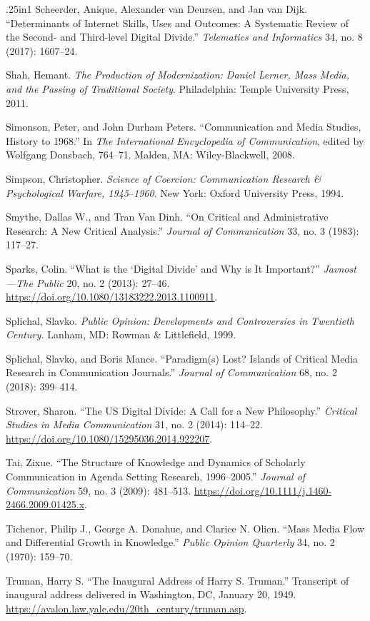 \documentclass{tufte-handout}
\begin{document}
\begin{hangparas}{.25in}{1}
Scheerder, Anique, Alexander van Deursen, and Jan van Dijk.
``Determinants of Internet Skills, Uses and Outcomes: A Systematic
Review of the Second- and Third-level Digital Divide.'' \emph{Telematics
and Informatics} 34, no. 8 (2017): 1607--24.

Shah, Hemant. \emph{The Production of Modernization: Daniel Lerner, Mass
Media, and the Passing of Traditional Society}. Philadelphia: Temple
University Press, 2011.

Simonson, Peter, and John Durham Peters. ``Communication and Media
Studies, History to 1968.'' In \emph{The International Encyclopedia of
Communication}, edited by Wolfgang Donsbach, 764--71. Malden, MA:
Wiley-Blackwell, 2008.

Simpson, Christopher. \emph{Science of Coercion: Communication Research
\& Psychological Warfare, 1945}--\emph{1960}. New York: Oxford
University Press, 1994.

Smythe, Dallas W., and Tran Van Dinh. ``On Critical and Administrative
Research: A New Critical Analysis.'' \emph{Journal of Communication} 33,
no. 3 (1983): 117--27.

Sparks, Colin. ``What is the `Digital Divide' and Why is It Important?''
\emph{Javnost---The Public} 20, no. 2 (2013): 27--46.
\url{https://doi.org/10.1080/13183222.2013.1100911}.

Splichal, Slavko. \emph{Public Opinion:} \emph{Developments and
Controversies in Twentieth Century.} Lanham, MD: Rowman \& Littlefield,
1999.

Splichal, Slavko, and Boris Mance. ``Paradigm(s) Lost? Islands of
Critical Media Research in Communication Journals.'' \emph{Journal of
Communication} 68, no. 2 (2018): 399--414.

Strover, Sharon. ``The US Digital Divide: A Call for a New Philosophy.''
\emph{Critical Studies in Media Communication} 31, no. 2 (2014):
114--22. \url{https://doi.org/10.1080/15295036.2014.922207}.

Tai, Zixue. ``The Structure of Knowledge and Dynamics of Scholarly
Communication in Agenda Setting Research, 1996--2005.'' \emph{Journal of
Communication} 59, no. 3 (2009): 481--513.
\url{https://doi.org/10.1111/j.1460-2466.2009.01425.x}.

Tichenor, Philip J., George A. Donahue, and Clarice N. Olien. ``Mass
Media Flow and Differential Growth in Knowledge.'' \emph{Public Opinion
Quarterly} 34, no. 2 (1970): 159--70.

Truman, Harry S. ``The Inaugural Address of Harry S. Truman.''
Transcript of inaugural address delivered in Washington, DC, January 20,
1949. \url{https://avalon.law.yale.edu/20th_century/truman.asp}.


\end{hangparas}
\end{document}
